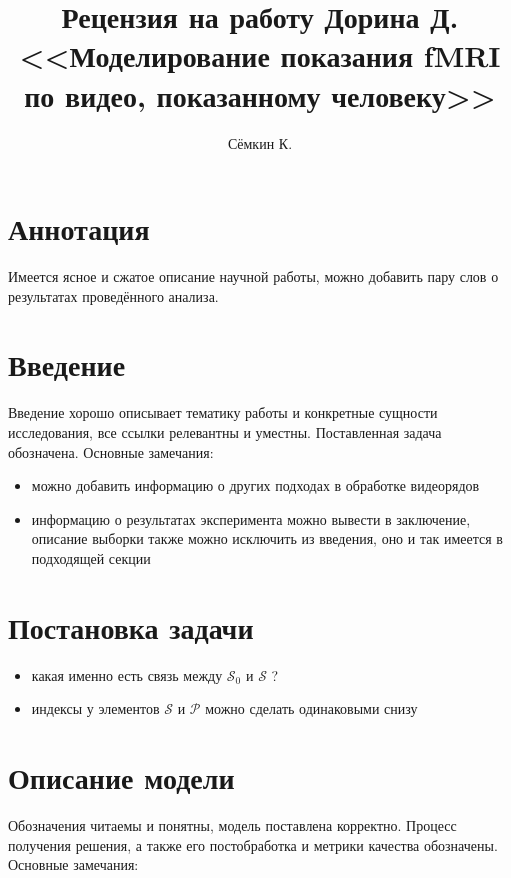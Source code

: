 

\title{Рецензия на работу Дорина Д. <<Моделирование показания fMRI по видео, показанному человеку>>}
\author{Сёмкин К.}
\date{}


	\maketitle
	
	\section*{Аннотация}
	
	Имеется ясное и сжатое описание научной работы, можно добавить пару слов о результатах проведённого анализа.
	
	\section*{Введение}
	
	Введение хорошо описывает тематику работы и конкретные сущности исследования, все ссылки релевантны и уместны. Поставленная задача обозначена. Основные замечания:
	
	\begin{itemize}
		\item можно добавить информацию о других подходах в обработке видеорядов
		\item информацию о результатах эксперимента можно вывести в заключение, описание выборки также можно исключить из введения, оно и так имеется в подходящей секции
	\end{itemize}

	\section*{Постановка задачи}
	
	\begin{itemize}
		\item какая именно есть связь между $\mathcal{S}_0$ и $\mathcal{S}$ ?
		\item индексы у элементов $\mathcal{S}$ и $\mathcal{P}$ можно сделать одинаковыми снизу
	\end{itemize}

	\section*{Описание модели}
	
	Обозначения читаемы и понятны, модель поставлена корректно. Процесс получения решения, а также его постобработка и метрики качества обозначены. Основные замечания:
	

